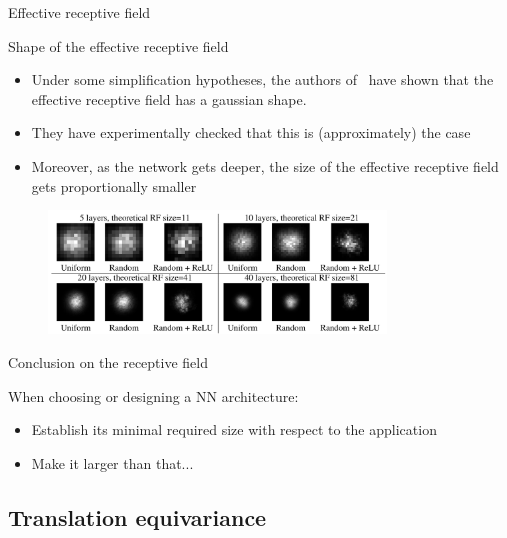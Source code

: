 \documentclass[xcolor=pdftex,dvipsnames,table,mathserif]{beamer}
\begin{document}
\begin{frame}{Effective receptive field}

\begin{block}{Shape of the effective receptive field}
\begin{itemize}
\item   Under some simplification hypotheses, the authors of~\cite{luo_understanding_2017} have shown that the effective receptive field has a gaussian shape.
  \item They have experimentally checked that this is (approximately) the case
  \item Moreover, as the network gets deeper, the size of the effective receptive field gets proportionally smaller
\end{itemize}

\end{block}

  \begin{figure}
    \includegraphics[width=0.8\textwidth]{effective_receptive_field.png}
  \end{figure}



\end{frame}


\begin{frame}{Conclusion on the receptive field}

  When choosing or designing a NN architecture:
\begin{itemize}
\item Establish its minimal required size with respect to the application
\item Make it larger than that...
\end{itemize}

\end{frame}


\subsection{Translation equivariance}
\end{document}
